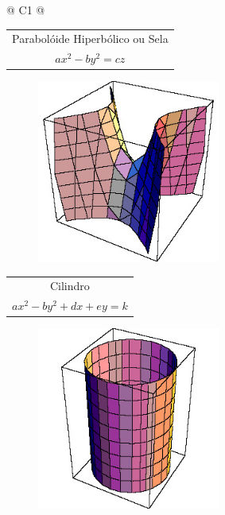 \begin{longtable}{
		@{}
		C{1\textwidth} 
		@{}}
\begin{tabular}[c]{@{}c@{}}
				{\large Parabolóide Hiperbólico ou Sela} \\

				{\large $ax^{2} - by^{2} = cz$}\\

            \end{tabular}

			\begin{figure}[H]
			    \centering
				\includegraphics[height=6cm]{images/ufmg_figura-1-8}
			\end{figure}
			\tabularnewline
			\midrule
			\begin{tabular}[c]{@{}c@{}} 

				{\large Cilindro} \\

				{\large $ax^{2} - by^{2} + dx + ey = k$}\\

            \end{tabular}

			\begin{figure}[H]
			    \centering
				\includegraphics[height=6cm]{images/ufmg_figura-1-9}
			\end{figure}
			\tabularnewline
			\bottomrule

		\end{longtable}
		

